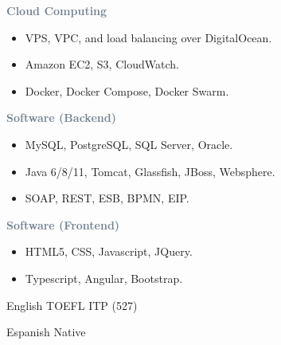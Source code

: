 



\divider


\textcolor{SlateGrey}{\textbf{Cloud Computing}}
\newline

\begin{itemize}
    \item VPS, VPC, and load balancing over DigitalOcean.
    \item Amazon EC2, S3, CloudWatch.
    \item Docker, Docker Compose, Docker Swarm.
\end{itemize}

\textcolor{SlateGrey}{\textbf{Software (Backend)}}
\newline

\begin{itemize}
    \item MySQL, PostgreSQL, SQL Server, Oracle.
    \item Java 6/8/11, Tomcat, Glassfish, JBoss, Websphere.
    \item SOAP, REST, ESB, BPMN, EIP.
\end{itemize}

\textcolor{SlateGrey}{\textbf{Software (Frontend)}}
\newline

\begin{itemize}
    \item HTML5, CSS, Javascript, JQuery.
    \item Typescript, Angular, Bootstrap.
\end{itemize}


English \hfill TOEFL ITP (527) 

\divider

Espanish \hfill Native 





